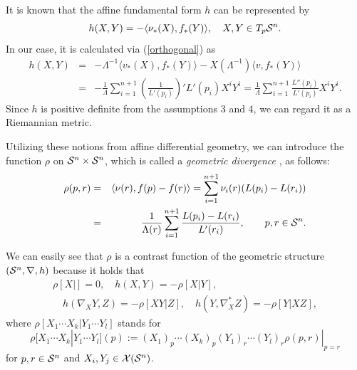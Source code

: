 \documentclass{llncs}
\begin{document}
It is known \cite{NS} that the affine fundamental form $h$ can be 
represented by 
\[
	h(X,Y)=-\langle \nu_*(X),f_*(Y) \rangle, 
	\quad X,Y \in T_p{\cal S}^n.
\]
In our case, it is calculated via (\ref{orthogonal}) as
\begin{eqnarray*}
	h(X,Y)&=&-\Lambda^{-1} \langle v_*(X),f_*(Y) \rangle
		-X (\Lambda^{-1})\langle v,f_*(Y) \rangle \\
	&=&-\frac{1}{\Lambda} \sum_{i=1}^{n+1} 
		\left( \frac{1}{L'(p_i)} \right)' L'(p_i) X^iY^i 
	=\frac{1}{\Lambda} \sum_{i=1}^{n+1} \frac{L''(p_i)}{L'(p_i)}X^iY^i.
\end{eqnarray*}
Since $h$ is positive definite from the assumptions 3 and 4, 
we can regard it as a Riemannian metric.

Utilizing these notions from affine differential geometry,
we can introduce 
the function $\rho$ on ${\cal S}^n \times {\cal S}^n$, which is called 
a {\em geometric divergence} \cite{Kurose94}, as follows:
\begin{eqnarray}
	\rho(p,r)&=&\langle \nu(r), f(p) - f(r) \rangle 
	= \sum_{i=1}^{n+1} \nu_i(r)(L(p_i) - L(r_i)) \nonumber \\
	&=& \frac{1}{\Lambda(r)} \sum_{i=1}^{n+1} 
		\frac{L(p_i) - L(r_i)}{L'(r_i)},
		\qquad p, r \in {\cal S}^n.
\label{geom_div}
\end{eqnarray}

We can easily see that $\rho$ is 
a contrast function \cite{Eguchi92,AN} of the geometric structure 
$({\cal S}^n,\nabla,h)$ because it holds that
\begin{eqnarray}
&	\rho[X|]=0, \quad h(X,Y)=-\rho[X|Y], &
\label{contrast_geometry1} \\
&	\quad h(\nabla_X Y,Z)=-\rho[XY|Z], \quad h(Y, \nabla^*_XZ)=-\rho[Y|XZ],
&
\label{contrast_geometry2}
\end{eqnarray}
where $\rho[X_1 \cdots X_k | Y_1 \cdots Y_l]$ stands for
\[
	\rho[X_1 \cdots X_k | Y_1 \cdots Y_l](p):=
		(X_1)_p \cdots (X_k)_p (Y_1)_r \cdots (Y_l)_r \rho(p,r)|_{p=r}
\]
for $p,r \in {\cal S}^n$ and $X_i, Y_j \in {\cal X}({\cal S}^n)$.
\end{document}
